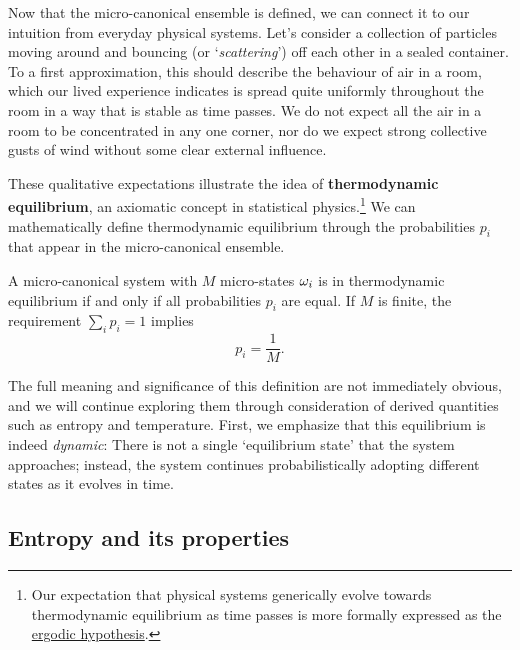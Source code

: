 Now that the micro-canonical ensemble is defined, we can connect it to our intuition from everyday physical systems.
Let's consider a collection of particles moving around and bouncing (or `\textit{scattering}') off each other in a sealed container.
To a first approximation, this should describe the behaviour of air in a room, which our lived experience indicates is spread quite uniformly throughout the room in a way that is stable as time passes.
We do not expect all the air in a room to be concentrated in any one corner, nor do we expect strong collective gusts of wind without some clear external influence.

These qualitative expectations illustrate the idea of \textbf{thermodynamic equilibrium}, an axiomatic concept in statistical physics.\footnote{Our expectation that physical systems generically evolve towards thermodynamic equilibrium as time passes is more formally expressed as the \href{https://en.wikipedia.org/wiki/Ergodic_hypothesis}{ergodic hypothesis}.}
We can mathematically define thermodynamic equilibrium through the probabilities $p_i$ that appear in the micro-canonical ensemble.

\begin{shaded}
  A micro-canonical system \Om with $M$ micro-states $\omega_i$ is in thermodynamic equilibrium if and only if all probabilities $p_i$ are equal.
  If $M$ is finite, the requirement $\sum_i p_i = 1$ implies
  \begin{equation}
    \label{eq:micro_equil}
    p_i = \frac{1}{M}.
  \end{equation}
\end{shaded}

The full meaning and significance of this definition are not immediately obvious, and we will continue exploring them through consideration of derived quantities such as entropy and temperature.
First, we emphasize that this equilibrium is indeed \textit{dynamic}: There is not a single `equilibrium state' that the system approaches; instead, the system continues probabilistically adopting different states as it evolves in time.



\subsection{Entropy and its properties}

